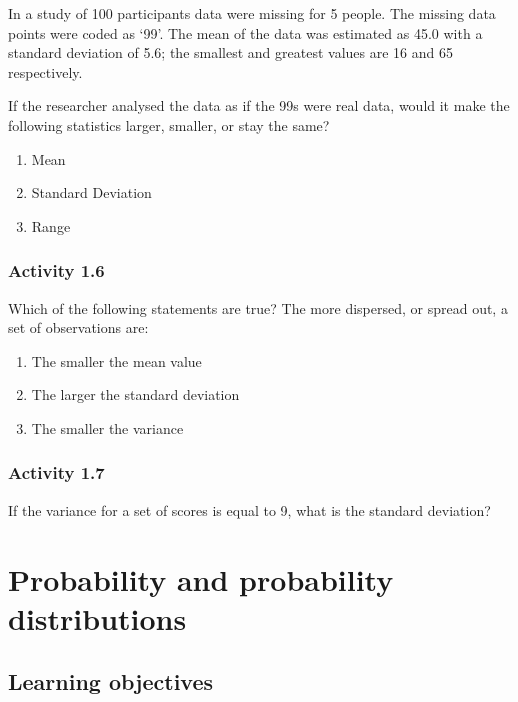 \documentclass[
]{memoir}
\providecommand{\tightlist}{%
  \setlength{\itemsep}{0pt}\setlength{\parskip}{0pt}}
\begin{document}
In a study of 100 participants data were missing for 5 people. The missing data points were coded as `99'. The mean of the data was estimated as 45.0 with a standard deviation of 5.6; the smallest and greatest values are 16 and 65 respectively.

If the researcher analysed the data as if the 99s were real data, would it make the following statistics larger, smaller, or stay the same?

\begin{enumerate}
\def\labelenumi{\alph{enumi})}
\tightlist
\item
  Mean
\item
  Standard Deviation
\item
  Range
\end{enumerate}

\hypertarget{activity-1.6}{%
\subsection*{Activity 1.6}\label{activity-1.6}}

Which of the following statements are true? The more dispersed, or spread out, a set of observations are:

\begin{enumerate}
\def\labelenumi{\alph{enumi})}
\tightlist
\item
  The smaller the mean value
\item
  The larger the standard deviation
\item
  The smaller the variance
\end{enumerate}

\hypertarget{activity-1.7}{%
\subsection*{Activity 1.7}\label{activity-1.7}}

If the variance for a set of scores is equal to 9, what is the standard deviation?

\hypertarget{probability-and-probability-distributions}{%
\chapter{Probability and probability distributions}\label{probability-and-probability-distributions}}

\hypertarget{learning-objectives-1}{%
\section*{Learning objectives}\label{learning-objectives-1}}
\end{document}
